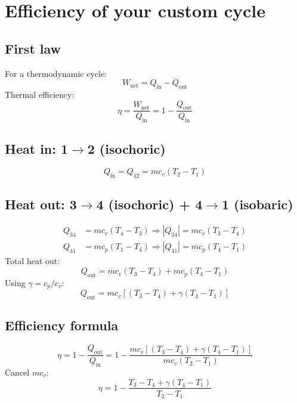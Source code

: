 \documentclass{article}
\begin{document}
\section*{Efficiency of your custom cycle}

\subsection*{First law}
For a thermodynamic cycle:
\begin{equation}
W_{\text{net}} = Q_{\text{in}} - Q_{\text{out}}
\end{equation}
Thermal efficiency:
\begin{equation}
\eta = \frac{W_{\text{net}}}{Q_{\text{in}}} = 1 - \frac{Q_{\text{out}}}{Q_{\text{in}}}
\end{equation}

\subsection*{Heat in: 1$\rightarrow$2 (isochoric)}
\begin{equation}
Q_{\text{in}} = Q_{12} = m c_v (T_2 - T_1)
\end{equation}

\subsection*{Heat out: 3$\rightarrow$4 (isochoric) + 4$\rightarrow$1 (isobaric)}
\begin{align}
Q_{34} &= m c_v (T_4 - T_3) \Rightarrow |Q_{34}| = m c_v (T_3 - T_4) \\
Q_{41} &= m c_p (T_1 - T_4) \Rightarrow |Q_{41}| = m c_p (T_4 - T_1)
\end{align}
Total heat out:
\begin{equation}
Q_{\text{out}} = m c_v (T_3 - T_4) + m c_p (T_4 - T_1)
\end{equation}
Using $\gamma = c_p/c_v$:
\begin{equation}
Q_{\text{out}} = m c_v \left[ (T_3 - T_4) + \gamma (T_4 - T_1) \right]
\end{equation}

\subsection*{Efficiency formula}
\begin{equation}
\eta = 1 - \frac{Q_{\text{out}}}{Q_{\text{in}}}
= 1 - \frac{m c_v \left[ (T_3 - T_4) + \gamma (T_4 - T_1) \right]}{m c_v (T_2 - T_1)}
\end{equation}
Cancel $m c_v$:
\begin{equation}
\boxed{
\eta = 1 - \frac{T_3 - T_4 + \gamma (T_4 - T_1)}{T_2 - T_1}
}
\end{equation}
\end{document}
